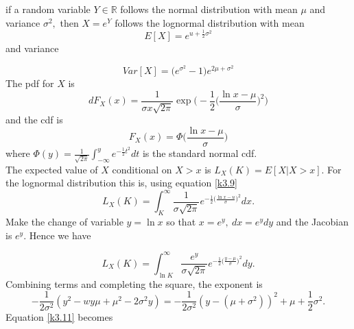 \documentclass[a4 paper, 12pt]{report}
\theoremstyle{plain}
\begin{document}
if a random variable $Y\in\mathbb{R}$ follows the normal distribution with mean $\mu$ and variance $\sigma^2,$ then $X = e^Y$ follows the lognormal distribution with mean
\begin{equation}\label{k3.7}
E[X] = e^{u+\frac{1}{2}\sigma^2}
\end{equation}
and variance

\begin{equation}\label{k3.8}
Var[X] = \bigg(e^{\sigma^2} - 1\bigg)e^{2\mu+\sigma^2}
\end{equation}
The pdf for $X$ is
\begin{equation}\label{k3.9}
dF_X(x) = \frac{1}{\sigma x\sqrt{2\pi}}\exp\bigg(-\frac{1}{2}\bigg(\frac{\ln x - \mu}{\sigma}\bigg)^2\bigg)
\end{equation}
and the cdf is
\begin{equation}\label{k3.10}
F_X(x) = \Phi\bigg(\frac{\ln x - \mu}{\sigma}\bigg)
\end{equation}
where $\Phi(y) = \frac{1}{\sqrt{2\pi}}\int_{-\infty}^y e^{-\frac{1}{2}t^2}dt$ is the standard normal cdf.\\
The expected value of $X$ conditional on $X>x$ is $L_X(K) = E[X|X>x]$. For the lognormal distribution this is, using equation \eqref{k3.9}
$$
L_X(K) = \int_K^\infty\frac{1}{\sigma\sqrt{2\pi}}e^{-\frac{1}{2}\bigg(\frac{\ln x - u}{\sigma}\bigg)^2}dx.
$$
Make the change of variable $y = \ln x$ so that $x = e^y,~dx = e^ydy$ and the Jacobian is $e^y$. Hence we have

\begin{equation}\label{k3.11}
L_X(K) = \int_{\ln K}^\infty\frac{e^y}{\sigma\sqrt{2\pi}}e^{-\frac{1}{2}\bigg(\frac{y-\mu}{\sigma}\bigg)^2}dy.
\end{equation}
Combining terms and completing the square, the exponent is
$$
-\frac{1}{2\sigma^2}(y^2-wy\mu+\mu^2-2\sigma^2y) = -\frac{1}{2\sigma^2}(y-(\mu+\sigma^2))^2+\mu+\frac{1}{2}\sigma^2.
$$
Equation \eqref{k3.11} becomes
\end{document}
